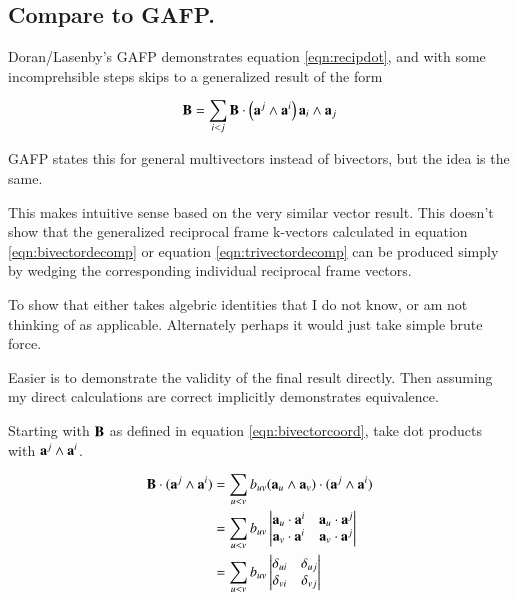 \documentclass{article}      %
\begin{document}
\subsection{ Compare to GAFP. }

Doran/Lasenby's GAFP 
demonstrates equation \ref{eqn:recipdot}, and with some incomprehsible steps skips to a generalized
result of the form

\begin{equation}\label{eqn:bivectordecompwithrecipbivector}
\mathbf{B} = \sum_{i<j} \mathbf{B} \cdot \left(\mathbf{a}^j \wedge \mathbf{a}^i\right) \mathbf{a}_i \wedge \mathbf{a}_j
\end{equation}

GAFP states this for general multivectors instead of bivectors, but the idea is the same.

This makes intuitive sense based on the very similar vector result.  This doesn't show that
the generalized reciprocal frame k-vectors calculated in 
equation \ref{eqn:bivectordecomp} or equation \ref{eqn:trivectordecomp} can be produced simply
by wedging the corresponding individual reciprocal frame vectors.

To show that either takes algebric identities that I do not know, or am not thinking of as applicable.
Alternately perhaps it would just take simple brute force.

Easier is to demonstrate the validity of the final result directly.  Then assuming my direct calculations
are correct implicitly demonstrates equivalence.

Starting with $\mathbf{B}$ as defined in equation \ref{eqn:bivectorcoord}, take dot products with 
$\mathbf{a}^j \wedge \mathbf{a}^i$.

\begin{align*}
\mathbf{B} \cdot (\mathbf{a}^j \wedge \mathbf{a}^i)
 &= \sum_{u<v} b_{uv} (\mathbf{a}_u \wedge \mathbf{a}_v) \cdot (\mathbf{a}^j \wedge \mathbf{a}^i) \\
 &= \sum_{u<v} b_{uv} 
\begin{vmatrix}
\mathbf{a}_u \cdot \mathbf{a}^i & \mathbf{a}_u \cdot \mathbf{a}^j \\
\mathbf{a}_v \cdot \mathbf{a}^i & \mathbf{a}_v \cdot \mathbf{a}^j \\
\end{vmatrix} \\
 &= \sum_{u<v} b_{uv} 
\begin{vmatrix}
\delta_{ui} & \delta_{uj} \\
\delta_{vi} & \delta_{vj} \\
\end{vmatrix} \\
\end{align*}
\end{document}
